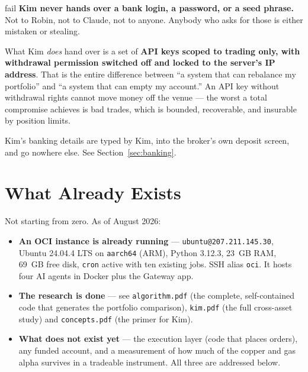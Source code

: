 \documentclass[11pt,a4paper]{article}
\begin{document}
\vspace{1em}
\begin{resultbox}{fail}
\textbf{Kim never hands over a bank login, a password, or a
seed phrase.} Not to Robin, not to Claude, not to anyone. Anybody who
asks for those is either mistaken or stealing.

\vspace{0.5em}
What Kim \emph{does} hand over is a set of \textbf{API keys scoped to
trading only, with withdrawal permission switched off and locked to
the server's IP address}. That is the entire difference between
``a system that can rebalance my portfolio'' and ``a system that can
empty my account.'' An API key without withdrawal rights cannot move
money off the venue --- the worst a total compromise achieves is bad
trades, which is bounded, recoverable, and insurable by position
limits.

\vspace{0.5em}
Kim's banking details are typed by Kim, into the broker's own deposit
screen, and go nowhere else. See Section~\ref{sec:banking}.
\end{resultbox}

\section{What Already Exists}

Not starting from zero. As of August 2026:

\begin{itemize}[leftmargin=2em]
    \item \textbf{An OCI instance is already running} ---
          \texttt{ubuntu@207.211.145.30}, Ubuntu 24.04.4 LTS on
          \texttt{aarch64} (ARM), Python 3.12.3, 23~GB RAM, 69~GB free
          disk, \texttt{cron} active with ten existing jobs. SSH alias
          \texttt{oci}. It hosts four AI agents in Docker plus the
          Gateway app.
    \item \textbf{The research is done} --- see
          \texttt{algorithm.pdf} (the complete, self-contained code that
          generates the portfolio comparison),
          \texttt{kim.pdf} (the full cross-asset study) and
          \texttt{concepts.pdf} (the primer for Kim).
    \item \textbf{What does not exist yet} --- the execution layer (code
          that places orders), any funded account, and a measurement of
          how much of the copper and gas alpha survives in a tradeable
          instrument. All three are addressed below.
\end{itemize}
\end{document}
